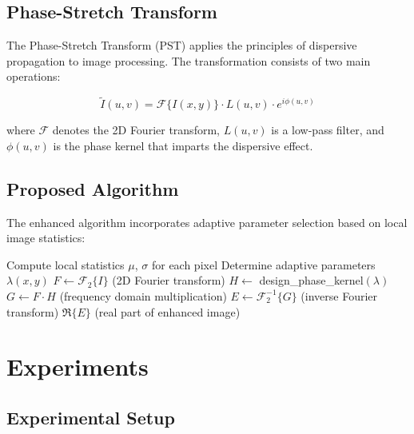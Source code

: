 \documentclass[journal,transmag]{IEEEtran}
\begin{document}
\subsection{Phase-Stretch Transform}

The Phase-Stretch Transform (PST) applies the principles of dispersive propagation to image processing. The transformation consists of two main operations:

\begin{equation}
    \label{eq:pst}
    \tilde{I}(u, v) = \mathcal{F}\{I(x, y)\} \cdot L(u, v) \cdot e^{i\phi(u, v)}
\end{equation}

where $\mathcal{F}$ denotes the 2D Fourier transform, $L(u,v)$ is a low-pass filter, and $\phi(u,v)$ is the phase kernel that imparts the dispersive effect.

\subsection{Proposed Algorithm}

The enhanced algorithm incorporates adaptive parameter selection based on local image statistics:

\begin{algorithm}[htp]
\caption{Adaptive Phase-Stretch Enhancement}
\label{alg:adaptive_pst}
\begin{algorithmic}[1]

  \State Compute local statistics $\mu$, $\sigma$ for each pixel
  \State Determine adaptive parameters $\lambda(x,y)$
  \State $F \gets \mathcal{F}_2\{I\}$ (2D Fourier transform)
  \State $H \gets$ design\_phase\_kernel$(\lambda)$
  \State $G \gets F \cdot H$ (frequency domain multiplication)
  \State $E \gets \mathcal{F}_2^{-1}\{G\}$ (inverse Fourier transform)
  \State \Return $\Re\{E\}$ (real part of enhanced image)
\end{algorithmic}
\end{algorithm}

\section{Experiments}

\subsection{Experimental Setup}
\end{document}
